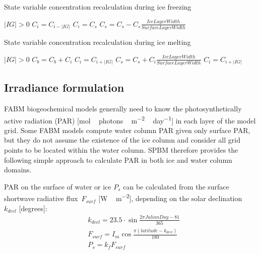 \documentclass[gmd, manuscript]{copernicus}
\begin{document}
\begin{algorithm}[htbp]
\caption{State variable concentration recalculation during ice freezing}
\label{a1}
\begin{algorithmic}
\REQUIRE $\lvert IG \rvert > 0$
        \STATE $C_{i} = C_{i - \lvert IG \rvert}$
    \ENDFOR
        \STATE $C_{i} = C_{s}$
        \STATE $C_{s} = C_{s} - C_{s}
               \frac{IceLayerWidth}{SurfaceLayerWidth}$
    \ENDFOR
\end{algorithmic}
\end{algorithm}

\begin{algorithm}[htbp]
\caption{State variable concentration recalculation during ice melting}
\label{a2}
\begin{algorithmic}
\REQUIRE $\lvert IG \rvert > 0$
            \STATE $C_{b} = C_{b} + C_{i}$
        \ENDFOR
            \STATE $C_{i} = C_{i + \lvert IG \rvert}$
        \ENDFOR
    \ELSE
        \STATE $C_{s} = C_{s} + C_{i}
               \frac{IceLayerWidth}{SurfaceLayerWidth}$
    \ENDFOR
        \STATE $C_{i} = C_{i + \lvert IG \rvert}$
    \ENDFOR
    \ENDIF
\end{algorithmic}
\end{algorithm}

\subsection{Irradiance formulation}
\label{subsec:Irradiance}
\textrm{FABM} biogeochemical models generally need to know the photosynthetically active radiation (\textrm{PAR}) [\unit{mol\,photons\,m^{-2}\,day^{-1}}] in each layer of the model grid.
Some \textrm{FABM} models compute water column \textrm{PAR} given only surface \textrm{PAR}, but they do not assume the existence of the ice column and consider all grid points to be located within the water column.
\textrm{SPBM} therefore provides the following simple approach to calculate \textrm{PAR} in both ice and water column domains.

\textrm{PAR} on the surface of water or ice $P_{s}$ can be calculated from the surface shortwave radiative flux~$F_{surf}$ [\unit{W\,m^{-2}}], depending on the solar declination~$k_{decl}$ [\unit{degrees}]:
\begin{align}
    &k_{decl} = 23.5 \cdot \sin{
        \frac{2 \pi JulianDay - 81}{365}} \\
    &F_{surf} = I_{m} \cos{
        \frac{\pi (latitude - k_{decl})}{180}} \\
    &P_{s} = k_{f} F_{surf}
\end{align}
\end{document}
